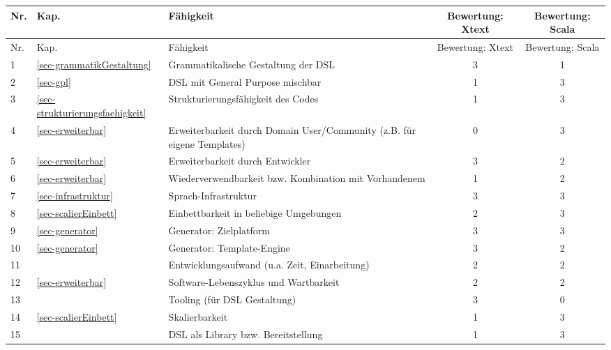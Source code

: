 \begin{longtable}{|p{0.5cm}|p{0.8cm}|p{5cm}|c|c|}

  \hline
  Nr. & Kap. & Fähigkeit & Bewertung: Xtext & Bewertung: Scala \\ \hline \hline
  \endfirsthead

  \hline
  Nr. & Kap. & Fähigkeit & Bewertung: Xtext & Bewertung: Scala \\ \hline
  \endhead

  1
  & \ref{sec-grammatikGestaltung}
  & Grammatikalische Gestaltung der DSL
  & 3
  & 1
  \\\hline

  2
  & \ref{sec-gpl}
  & DSL mit General Purpose mischbar
  & 1
  & 3
  \\\hline

  3
  & \ref{sec-strukturierungsfaehigkeit}
  & Strukturierungsfähigkeit des Codes
  & 1
  & 3
  \\\hline

  4
  & \ref{sec-erweiterbar}
  & Erweiterbarkeit durch Domain User/Community (z.B. für eigene Templates)
  & 0
  & 3
  \\\hline

  5
  & \ref{sec-erweiterbar}
  & Erweiterbarkeit durch Entwickler
  & 3
  & 2
  \\\hline

  6
  & \ref{sec-erweiterbar}
  & Wiederverwendbarkeit bzw. Kombination mit Vorhandenem
  & 1
  & 2
  \\\hline

  7
  & \ref{sec-infrastruktur}
  & Sprach-Infrastruktur
  & 3
  & 3
  \\\hline

  8
  & \ref{sec-scalierEinbett}
  & Einbettbarkeit in beliebige Umgebungen
  & 2
  & 3
  \\\hline

  9
  & \ref{sec-generator}
  & Generator: Zielplatform
  & 3
  & 3
  \\\hline

  10
  & \ref{sec-generator}
  & Generator: Template-Engine
  & 3
  & 2
  \\\hline

  11
  &
  & Entwicklungsaufwand (u.a. Zeit, Einarbeitung)
  & 2
  & 2
  \\\hline

  12
  & \ref{sec-erweiterbar}
  & Software-Lebenszyklus und Wartbarkeit
  & 2
  & 2
  \\\hline

  13
  &
  & Tooling (für DSL Gestaltung)
  & 3
  & 0
  \\\hline

  14
  & \ref{sec-scalierEinbett}
  & Skalierbarkeit
  & 1
  & 3
  \\\hline

  15
  &
  & DSL als Library bzw. Bereitstellung
  & 1
  & 3
  \\\hline

\end{longtable}


